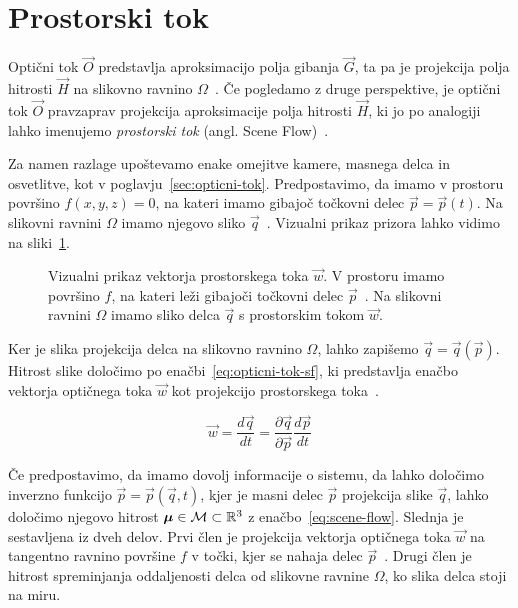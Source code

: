 \section{Prostorski tok}
Optični tok $\vec{O}$ predstavlja aproksimacijo polja gibanja $\vec{G}$, ta pa je projekcija polja hitrosti $\vec{H}$ na slikovno ravnino $\varOmega$~\cite{trucco1998introductory}. Če pogledamo z druge perspektive, je optični tok $\vec{O}$ pravzaprav projekcija aproksimacije polja hitrosti $\vec{H}$, ki jo po analogiji lahko imenujemo \emph{prostorski tok} (angl. Scene Flow)~\cite{vedula1999three}.

Za namen razlage upoštevamo enake omejitve kamere, masnega delca in osvetlitve, kot v poglavju~\ref{sec:opticni-tok}. Predpostavimo, da imamo v prostoru površino $f(x,y,z) = 0$, na kateri imamo gibajoč točkovni delec $\vec{p} = \vec{p}(t)$. Na slikovni ravnini $\varOmega$ imamo njegovo sliko $\vec{q}$~\cite{vedula1999three}. Vizualni prikaz prizora lahko vidimo na sliki~\ref{fig:scene-flow}. 




\begin{figure}[htb]
\centering

\caption[Vizualni prikaz vektorja prostorskega toka $\vec{w}$]{Vizualni prikaz vektorja prostorskega toka $\vec{w}$. V prostoru imamo površino $f$, na kateri leži gibajoči točkovni delec $\vec{p}$~\cite{vedula1999three}. Na slikovni ravnini $\varOmega$ imamo sliko delca $\vec{q}$ s prostorskim tokom $\vec{w}$.}
\label{fig:scene-flow}
\end{figure}



Ker je slika projekcija delca na slikovno ravnino $\varOmega$, lahko zapišemo $\vec{q} = \vec{q}(\vec{p})$. Hitrost slike določimo po enačbi~\eqref{eq:opticni-tok-sf}, ki predstavlja enačbo vektorja optičnega toka $\vec{w}$ kot projekcijo prostorskega toka~\cite{vedula1999three}. 


\begin{equation}\label{eq:opticni-tok-sf}
	\vec{w} = \frac{d\vec{q}}{dt} = \frac{\partial \vec{q}}{\partial \vec{p}}\frac{d\vec{p}}{dt}
\end{equation}

Če predpostavimo, da imamo dovolj informacije o sistemu, da lahko določimo inverzno funkcijo $\vec{p} = \vec{p}(\vec{q},t)$, kjer je masni delec $\vec{p}$ projekcija slike $\vec{q}$, lahko določimo njegovo hitrost ${\boldsymbol{\mu}} \in \mathcal{M} \subset \mathbb{R}^3$ z enačbo~\eqref{eq:scene-flow}. Slednja je sestavljena iz dveh delov. Prvi člen je projekcija vektorja optičnega toka $\vec{w}$ na tangentno ravnino površine $f$ v točki, kjer se nahaja delec $\vec{p}$~\cite{vedula1999three}. Drugi člen je hitrost spreminjanja oddaljenosti delca od slikovne ravnine $\varOmega$, ko slika delca stoji na miru. 

